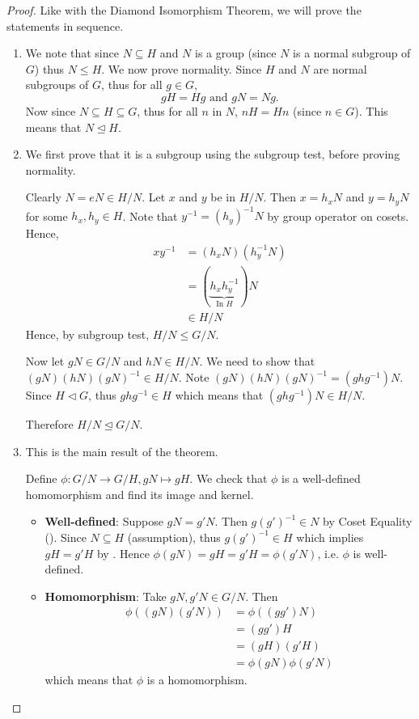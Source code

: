 \begin{proof}
    Like with the Diamond Isomorphism Theorem, we will prove the statements in sequence.

    \newpage

    \begin{enumerate}
        \item We note that since $N \subseteq H$ and $N$ is a group (since $N$ is a normal subgroup of $G$) thus $N \leq H$. We now prove normality. Since $H$ and $N$ are normal subgroups of $G$, thus for all $g \in G$,
        \[
            gH = Hg \text{ and } gN = Ng.
        \]
        Now since $N \subseteq H \subseteq G$, thus for all $n$ in $N$, $nH = Hn$ (since $n \in G$). This means that $N \unlhd H$.

        \item We first prove that it is a subgroup using the subgroup test, before proving normality.

        Clearly $N = eN \in H/N$. Let $x$ and $y$ be in $H/N$. Then $x=h_xN$ and $y=h_yN$ for some $h_x, h_y \in H$. Note that $y^{-1} = (h_y)^{-1}N$ by group operator on cosets. Hence,
        \begin{align*}
            xy^{-1} &= (h_xN)(h_y^{-1}N)\\
            &= (\underbrace{h_xh_y^{-1}}_{\text{In }H})N\\
            &\in H/N
        \end{align*}
        Hence, by subgroup test, $H/N \leq G/N$.

        Now let $gN \in G/N$ and $hN \in H/N$. We need to show that $(gN)(hN)(gN)^{-1} \in H/N$. Note $(gN)(hN)(gN)^{-1} = (ghg^{-1})N$. Since $H \lhd G$, thus $ghg^{-1} \in H$ which means that $(ghg^{-1})N \in H/N$.

        Therefore $H/N \unlhd G/N$.

        \item This is the main result of the theorem.

        Define $\phi: G/N \to G/H, gN \mapsto gH$. We check that $\phi$ is a well-defined homomorphism and find its image and kernel.
        \begin{itemize}
            \item \textbf{Well-defined}: Suppose $gN = g'N$. Then $g(g')^{-1} \in N$ by Coset Equality (). Since $N \subseteq H$ (assumption), thus $g(g')^{-1} \in H$ which implies $gH = g'H$ by . Hence $\phi(gN) = gH = g'H = \phi(g'N)$, i.e. $\phi$ is well-defined.
            \item \textbf{Homomorphism}: Take $gN, g'N \in G/N$. Then
            \begin{align*}
                \phi((gN)(g'N)) &= \phi((gg')N)\\
                &= (gg')H\\
                &= (gH)(g'H)\\
                &= \phi(gN)\phi(g'N)
            \end{align*}
            which means that $\phi$ is a homomorphism.
            

\end{itemize}
\end{enumerate}
\end{proof}
